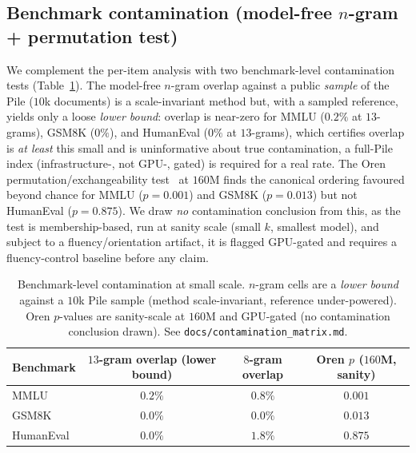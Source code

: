 \subsection{Benchmark contamination (model-free $n$-gram + permutation test)}
\label{sec:res-matrix}
We complement the per-item analysis with two benchmark-level contamination tests
(Table~\ref{tab:matrix}). The model-free $n$-gram overlap against a public \emph{sample} of the Pile
($10$k documents) is a scale-invariant method but, with a sampled reference, yields only a loose
\emph{lower bound}: overlap is near-zero for MMLU ($0.2\%$ at $13$-grams), GSM8K ($0\%$), and
HumanEval ($0\%$ at $13$-grams), which certifies overlap is \emph{at least} this small and is
uninformative about true contamination, a full-Pile index (infrastructure-, not GPU-, gated) is
required for a real rate. The Oren permutation/exchangeability test~\citep{oren2024proving} at $160$M
finds the canonical ordering favoured beyond chance for MMLU ($p=0.001$) and GSM8K ($p=0.013$) but
not HumanEval ($p=0.875$). We draw \emph{no} contamination conclusion from this, as the test is
membership-based, run at sanity scale (small $k$, smallest model), and subject to a fluency/orientation
artifact, it is flagged GPU-gated and requires a fluency-control baseline before any claim.

\begin{table}[t]
\centering\footnotesize\setlength{\tabcolsep}{4pt}
\begin{tabular}{@{}lccc@{}}
\toprule
Benchmark & $13$-gram overlap (lower bound) & $8$-gram overlap & Oren $p$ ($160$M, sanity) \\
\midrule
MMLU & $0.2\%$ & $0.8\%$ & $0.001$ \\
GSM8K & $0.0\%$ & $0.0\%$ & $0.013$ \\
HumanEval & $0.0\%$ & $1.8\%$ & $0.875$ \\
\bottomrule
\end{tabular}
\caption{Benchmark-level contamination at small scale. $n$-gram cells are a \emph{lower bound}
against a $10$k Pile sample (method scale-invariant, reference under-powered). Oren $p$-values are
sanity-scale at $160$M and GPU-gated (no contamination conclusion drawn). See
\texttt{docs/contamination\_matrix.md}.}
\label{tab:matrix}
\end{table}
